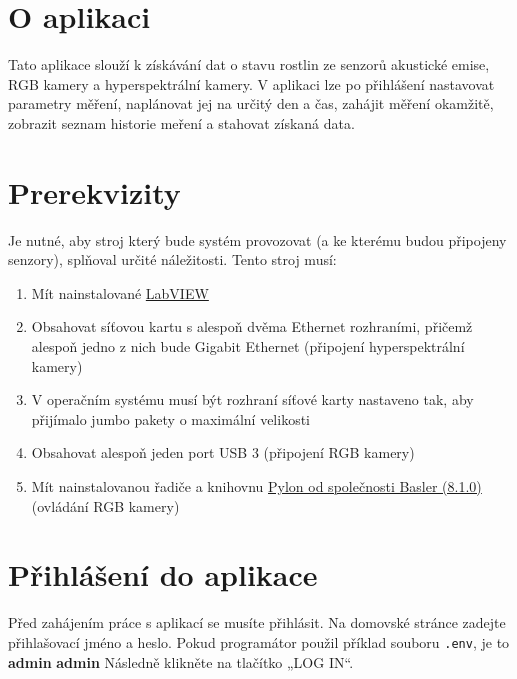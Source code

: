 \documentclass[12pt]{article}
\begin{document}
    \begin{teamwork}

        \section{O aplikaci}\label{sec:o-aplikace}

        Tato aplikace slouží k získávání dat o stavu rostlin ze senzorů akustické emise, RGB kamery a hyperspektrální kamery.
        V aplikaci lze po přihlášení nastavovat parametry měření, naplánovat jej na určitý den a čas, zahájit měření okamžitě, zobrazit seznam historie meření a stahovat získaná data.

        \section{Prerekvizity}\label{sec:prerekvizity}

        Je nutné, aby stroj který bude systém provozovat (a ke kterému budou připojeny senzory), splňoval určité náležitosti.
        Tento stroj musí:

        \begin{enumerate}
            \item Mít nainstalované \href{https://www.ni.com/en/support/downloads/software-products/download.labview.html#559067}{LabVIEW}
            \item Obsahovat síťovou kartu s alespoň dvěma Ethernet rozhraními, přičemž alespoň jedno z
            nich bude Gigabit Ethernet (připojení hyperspektrální kamery)
            \item V operačním systému musí být rozhraní síťové karty nastaveno tak, aby přijímalo jumbo pakety o maximální velikosti
            \item Obsahovat alespoň jeden port USB 3 (připojení RGB kamery)
            \item Mít nainstalovanou řadiče a knihovnu \href{https://www.baslerweb.com/en/downloads/software/?downloadCategory.values.label.data=pylon}{Pylon od společnosti Basler (8.1.0)} (ovládání RGB kamery)
        \end{enumerate}


        \section{Přihlášení do aplikace}\label{sec:prihlaseni-do-aplikace}

        Před zahájením práce s aplikací se musíte přihlásit.
        Na domovské stránce zadejte přihlašovací jméno a heslo.
        Pokud programátor použil příklad souboru \texttt{.env}, je to \textbf{admin} \textbf{admin}
        Následně klikněte na tlačítko „LOG IN“.


\end{teamwork}
\end{document}
